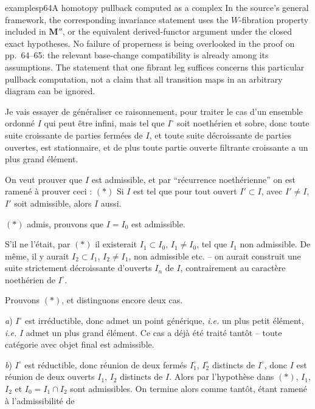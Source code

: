 \begin{dcomment}{examples}{p64}{A homotopy pullback computed as a complex}
In the source's general framework, the corresponding invariance statement uses the $W$-fibration property included in $\mathbf M''$, or the equivalent derived-functor argument under the closed exact hypotheses. No failure of properness is being overlooked in the proof on pp.~64--65: the relevant base-change compatibility is already among its assumptions. The statement that one fibrant leg suffices concerns this particular pullback computation, not a claim that all transition maps in an arbitrary diagram can be ignored.
\end{dcomment}


Je vais essayer de généraliser ce raisonnement, pour traiter le cas d'un ensemble ordonné $I$ qui peut être infini, mais tel que $I^\circ$ soit noethérien et sobre, donc toute suite croissante de parties fermées de $I$, et toute suite décroissante de parties ouvertes, est stationnaire, et de plus toute partie ouverte filtrante croissante a un plus grand élément.


On veut prouver que $I$ est admissible, et par “récurrence noethérienne” on est ramené à prouver ceci : $(*)$ Si $I$ est tel que pour tout ouvert $I' \subset I$, avec $I' \neq I$, $I'$ soit admissible, alors $I$ aussi.

$(*)$ admis, prouvons que $I = I_0$ est admissible.

S'il ne l'était, par $(*)$ il existerait $I_1 \subset I_0$, $I_1 \neq I_0$, tel que $I_1$ non admissible. De même, il y aurait $I_2 \subset I_1$, $I_2 \neq I_1$, non admissible etc. -- on aurait construit une suite strictement décroissante d'ouverts $I_n$ de $I$, contrairement au caractère noethérien de $I^\circ$.

Prouvons $(*)$, et distinguons encore deux cas.

\textit{a}) $I^\circ$ est irréductible, donc admet un point générique, \textit{i.e.} un plus petit élément, \textit{i.e.} $I$ admet un plus grand élément. Ce cas a déjà été traité tantôt -- toute catégorie avec objet final est admissible.

\textit{b}) $I^\circ$ est réductible, donc réunion de deux fermés $I_1^\circ$, $I_2^\circ$ distincts de $I^\circ$, donc $I$ est réunion de deux ouverts $I_1$, $I_2$ distincts de $I$. Alors par l'hypothèse dans $(*)$, $I_1$, $I_2$ et $I_0 = I_1 \cap I_2$ sont admissibles. On termine alors comme tantôt, étant ramené à l'admissibilité de 

